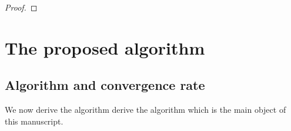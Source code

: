 \documentclass{article} %
\begin{document}
\begin{proof}
\end{proof}



\section{The proposed algorithm}
\label{sec:algo}
\subsection{Algorithm and convergence rate}
We now derive the algorithm derive the algorithm which is the main object of
this manuscript.
\end{document}
